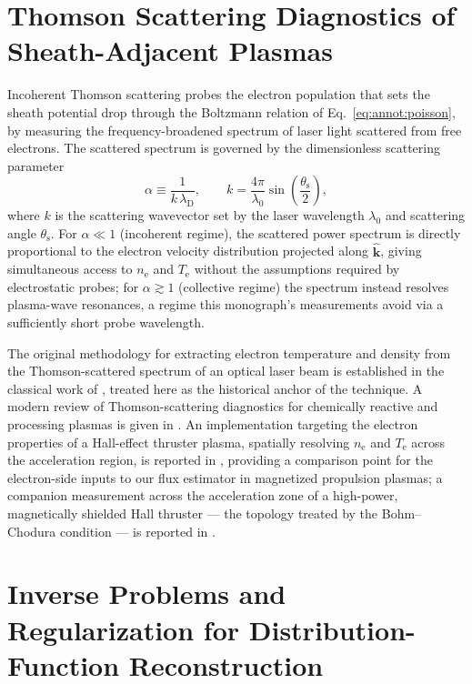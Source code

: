 \section{Thomson Scattering Diagnostics of Sheath-Adjacent Plasmas}
\label{app:annot:thomson}

Incoherent Thomson scattering probes the electron population that sets the sheath potential drop through the Boltzmann relation of Eq.~\eqref{eq:annot:poisson}, by measuring the frequency-broadened spectrum of laser light scattered from free electrons. The scattered spectrum is governed by the dimensionless scattering parameter
\begin{equation}
\alpha \equiv \frac{1}{k\,\lambda_{\mathrm{D}}},
\qquad
k = \frac{4\pi}{\lambda_{0}}\sin\!\left(\frac{\theta_{\mathrm{s}}}{2}\right),
\label{eq:annot:thomsonalpha}
\end{equation}
where $k$ is the scattering wavevector set by the laser wavelength $\lambda_{0}$ and scattering angle $\theta_{\mathrm{s}}$. For $\alpha \ll 1$ (incoherent regime), the scattered power spectrum is directly proportional to the electron velocity distribution projected along $\hat{\mathbf{k}}$, giving simultaneous access to $n_{\mathrm{e}}$ and $T_{\mathrm{e}}$ without the assumptions required by electrostatic probes; for $\alpha \gtrsim 1$ (collective regime) the spectrum instead resolves plasma-wave resonances, a regime this monograph's measurements avoid via a sufficiently short probe wavelength.

The original methodology for extracting electron temperature and density from the Thomson-scattered spectrum of an optical laser beam is established in the classical work of \cite{ref0384}, treated here as the historical anchor of the technique. A modern review of Thomson-scattering diagnostics for chemically reactive and processing plasmas is given in \cite{ref0354}. An implementation targeting the electron properties of a Hall-effect thruster plasma, spatially resolving $n_{\mathrm{e}}$ and $T_{\mathrm{e}}$ across the acceleration region, is reported in \cite{ref0355}, providing a comparison point for the electron-side inputs to our flux estimator in magnetized propulsion plasmas; a companion measurement across the acceleration zone of a high-power, magnetically shielded Hall thruster --- the topology treated by the Bohm--Chodura condition --- is reported in \cite{ref0356}.

\section{Inverse Problems and Regularization for Distribution-Function Reconstruction}
\label{app:annot:inverse-problems}

